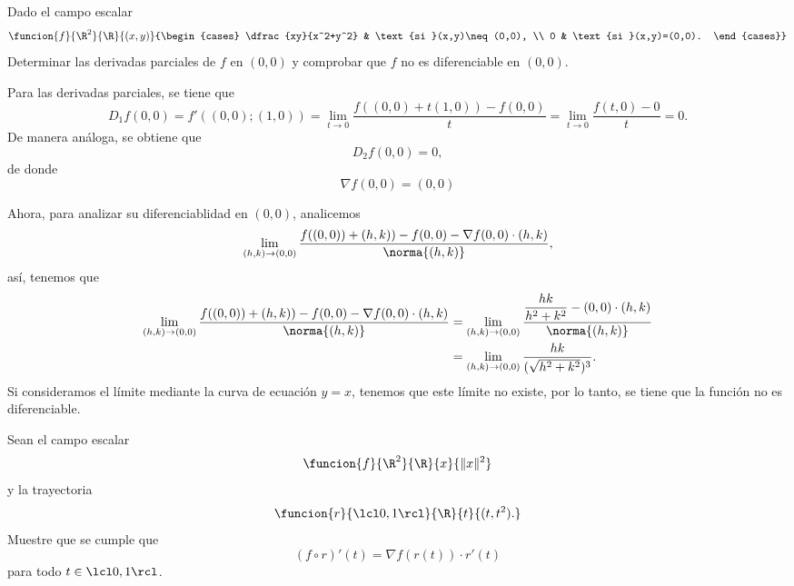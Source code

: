 \documentclass[a4,11pt]{aleph-examen}
\begin{document}
\begin{preguntas}
\begin{respuesta}
\begin{respuesta}
\item
    Dado el campo escalar 
    \[
        \funcion{f}{\R^2}{\R}{(x,y)}
            {\begin{cases}
                \dfrac{xy}{x^2+y^2} & \text{si }(x,y)\neq(0,0), \\
                0 & \text{si }(x,y)=(0,0).
            \end{cases}}
    \]
    Determinar las derivadas parciales de $f$ en $(0,0)$ y comprobar que $f$ no es diferenciable en $(0,0)$.
    
\begin{respuesta}
    Para las derivadas parciales, se tiene que
    \[
        D_1f(0,0)
        = f'((0,0);(1,0))
        = \lim_{t\to 0} \frac{f((0,0)+t(1,0))-f(0,0)}{t}
        = \lim_{t\to 0} \frac{f(t,0)-0}{t} = 0.
    \]
    De manera análoga, se obtiene que
    \[
        D_2f(0,0) = 0,
    \]
    de donde
    \[
        \nabla f(0,0)=(0,0)
    \]
    
    Ahora, para analizar su diferenciablidad en $(0,0)$, analicemos 
    \[
        \lim_{(h,k)\to (0,0)}\frac{f((0,0))+(h,k))-f(0,0)-\nabla f(0,0)\cdot (h,k)} {\norma{(h,k)}},
    \]
    así, tenemos que
    \begin{align*}
        \lim_{(h,k)\to (0,0)}\frac{f((0,0))+(h,k))-f(0,0)-\nabla f(0,0)\cdot (h,k)} {\norma{(h,k)}}
            & =  \lim_{(h,k)\to (0,0)}\frac{\dfrac{hk}{h^2+k^2}-(0,0)\cdot (h,k)}{\norma{(h,k)}}\\
            & =  \lim_{(h,k)\to (0,0)}\frac{hk}{(\sqrt{h^2+k^2})^3}.
    \end{align*}
    Si consideramos el límite mediante la curva de ecuación $y=x$, tenemos que este límite no existe, por lo tanto, se tiene que la función no es diferenciable.
\end{respuesta}



\item 
    Sean el campo escalar
	\[
		\funcion{f}{\R^2}{\R}{x}{\|x\|^2}
	\]
	y la trayectoria
	\[
		\funcion{r}{\lcl0,1\rcl}{\R}{t}{(t,t^2).}
	\]
	Muestre que se cumple que
	\[
		(f\circ r)'(t)=\nabla f(r(t))\cdot r'(t)
	\]
	para todo $t\in \lcl0,1\rcl$.


\end{respuesta}
\end{respuesta}
\end{preguntas}
\end{document}
